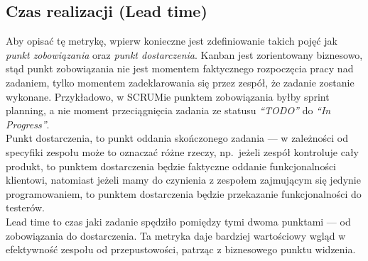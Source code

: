 \subsection{Czas realizacji (Lead time)}
Aby opisać tę metrykę, wpierw konieczne jest zdefiniowanie takich pojęć jak \textit{punkt zobowiązania} oraz \textit{punkt dostarczenia}.
Kanban jest zorientowany biznesowo, stąd punkt zobowiązania nie jest momentem faktycznego rozpoczęcia pracy nad zadaniem, tylko momentem zadeklarowania się przez zespół, że zadanie zostanie wykonane.
Przykładowo, w SCRUMie punktem zobowiązania byłby sprint planning, a nie moment przeciągnięcia zadania ze statusu \textit{``TODO''} do \textit{``In Progress''}.\\
Punkt dostarczenia, to punkt oddania skończonego zadania --- w zależności od specyfiki zespołu może to oznaczać różne rzeczy, np.\ jeżeli zespół kontroluje cały produkt, to punktem dostarczenia
będzie faktyczne oddanie funkcjonalności klientowi, natomiast jeżeli mamy do czynienia z zespołem zajmującym się jedynie programowaniem, to punktem dostarczenia będzie przekazanie funkcjonalności do testerów.\\
Lead time to czas jaki zadanie spędziło pomiędzy tymi dwoma punktami --- od zobowiązania do dostarczenia.
Ta metryka daje bardziej wartościowy wgląd w efektywność zespołu od przepustowości, patrząc z biznesowego punktu widzenia.
